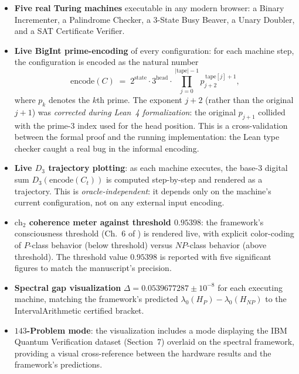 \documentclass[11pt,a4paper]{article}
\theoremstyle{definition}
\theoremstyle{remark}
\begin{document}
\begin{itemize}
\item \textbf{Five real Turing machines} executable in any modern
browser: a Binary Incrementer, a Palindrome Checker, a 3-State Busy
Beaver, a Unary Doubler, and a SAT Certificate Verifier.

\item \textbf{Live BigInt prime-encoding} of every configuration: for
each machine step, the configuration is encoded as the natural number
\[
\mathrm{encode}(C) \;=\; 2^{\mathrm{state}} \cdot 3^{\mathrm{head}} \cdot \prod_{j=0}^{|\mathrm{tape}|-1} p_{j+2}^{\,\mathrm{tape}[j]+1},
\]
where $p_k$ denotes the $k$th prime. The exponent $j+2$ (rather than the
original $j+1$) was \emph{corrected during Lean~4 formalization}: the
original $p_{j+1}$ collided with the prime-$3$ index used for the head
position. This is a cross-validation between the formal proof and the
running implementation: the Lean type checker caught a real bug in the
informal encoding.

\item \textbf{Live $D_3$ trajectory plotting}: as each machine
executes, the base-$3$ digital sum $D_3(\mathrm{encode}(C_t))$ is
computed step-by-step and rendered as a trajectory. This is
\emph{oracle-independent}: it depends only on the machine's current
configuration, not on any external input encoding.

\item \textbf{$\mathrm{ch}_2$ coherence meter against threshold
$0.95398$}: the framework's consciousness threshold (Ch.~6 of
\cite{cohen2025framework}) is rendered live, with explicit color-coding
of $P$-class behavior (below threshold) versus $NP$-class behavior
(above threshold). The threshold value $0.95398$ is reported with five
significant figures to match the manuscript's precision.

\item \textbf{Spectral gap visualization} $\Delta = 0.0539677287 \pm
10^{-8}$ for each executing machine, matching the framework's predicted
$\lambda_0(H_P) - \lambda_0(H_{NP})$ to the IntervalArithmetic
certified bracket.

\item \textbf{$143$-Problem mode}: the visualization includes a mode
displaying the IBM Quantum Verification dataset (Section~7) overlaid on
the spectral framework, providing a visual cross-reference between the
hardware results and the framework's predictions.
\end{itemize}
\end{document}
